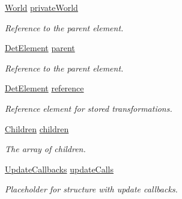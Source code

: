 \begin{DoxyCompactItemize}
\hyperlink{class_d_d4hep_1_1_geometry_1_1_world}{World} \hyperlink{class_d_d4hep_1_1_geometry_1_1_det_element_object_ace2a84b1e32a5263768b573df15d69ff}{privateWorld}
\begin{DoxyCompactList}\small\item\em Reference to the parent element. \item\end{DoxyCompactList}\item 
\hyperlink{class_d_d4hep_1_1_geometry_1_1_det_element}{DetElement} \hyperlink{class_d_d4hep_1_1_geometry_1_1_det_element_object_a70ce8bf0603c0a7a4f6331faf71e66b6}{parent}
\begin{DoxyCompactList}\small\item\em Reference to the parent element. \item\end{DoxyCompactList}\item 
\hyperlink{class_d_d4hep_1_1_geometry_1_1_det_element}{DetElement} \hyperlink{class_d_d4hep_1_1_geometry_1_1_det_element_object_a6b87ce69ec6c292e36e87f5fed651278}{reference}
\begin{DoxyCompactList}\small\item\em Reference element for stored transformations. \item\end{DoxyCompactList}\item 
\hyperlink{class_d_d4hep_1_1_geometry_1_1_det_element_object_aaf04a1f51d7a7ce4c0e0dc4863268d8a}{Children} \hyperlink{class_d_d4hep_1_1_geometry_1_1_det_element_object_add8a182c8a2e611f0241bb752dfe9046}{children}
\begin{DoxyCompactList}\small\item\em The array of children. \item\end{DoxyCompactList}\item 
\hyperlink{class_d_d4hep_1_1_geometry_1_1_det_element_object_aa3bda3e351cc13f5bcce906a67d21872}{UpdateCallbacks} \hyperlink{class_d_d4hep_1_1_geometry_1_1_det_element_object_a95a0d42e4b0410c815ba45eceb2e76a3}{updateCalls}
\begin{DoxyCompactList}\small\item\em Placeholder for structure with update callbacks. \item\end{DoxyCompactList}\end{DoxyCompactItemize}
\label{_amgrpd41d8cd98f00b204e9800998ecf8427e}

